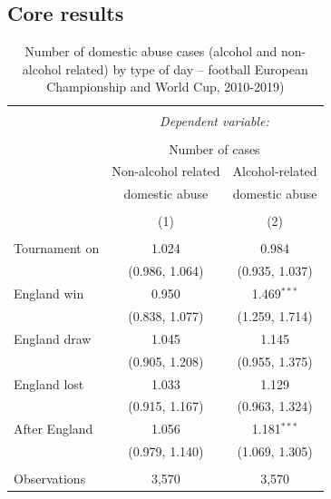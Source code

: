 \documentclass[12pt, a4paper]{article}
\begin{document}
\subsection{Core results} 
\begin{table}[!htbp] \centering 
  \begin{threeparttable}
  \caption{Number of domestic abuse cases (alcohol and non-alcohol related) by type of day -- football European Championship and World Cup, 2010-2019)} 
  \label{coremodel} 
\begin{tabular}{@{\extracolsep{5pt}}lcc} 
\\[-1.8ex]\hline 
\hline \\[-1.8ex] 
 & \multicolumn{2}{c}{\textit{Dependent variable:}} \\ 
\cline{2-3} 
\\[-1.8ex] & \multicolumn{2}{c}{Number of cases} \\ 
 & Non-alcohol related & Alcohol-related\\ 
 & domestic abuse & domestic abuse\\
\\[-1.8ex] & (1) & (2)\\ 
\hline \\[-1.8ex] 
 Tournament on & 1.024 & 0.984 \\ 
  & (0.986, 1.064) & (0.935, 1.037) \\ 
 England win & 0.950 & 1.469$^{***}$ \\ 
  & (0.838, 1.077) & (1.259, 1.714) \\ 
 England draw & 1.045 & 1.145 \\ 
  & (0.905, 1.208) & (0.955, 1.375) \\ 
 England lost & 1.033 & 1.129 \\ 
  & (0.915, 1.167) & (0.963, 1.324) \\ 
 After England & 1.056 & 1.181$^{***}$ \\ 
  & (0.979, 1.140) & (1.069, 1.305) \\ 
\hline \\[-1.8ex] 
Observations & 3,570 & 3,570 \\ 

\end{tabular}
\end{threeparttable}
\end{table}
\end{document}
